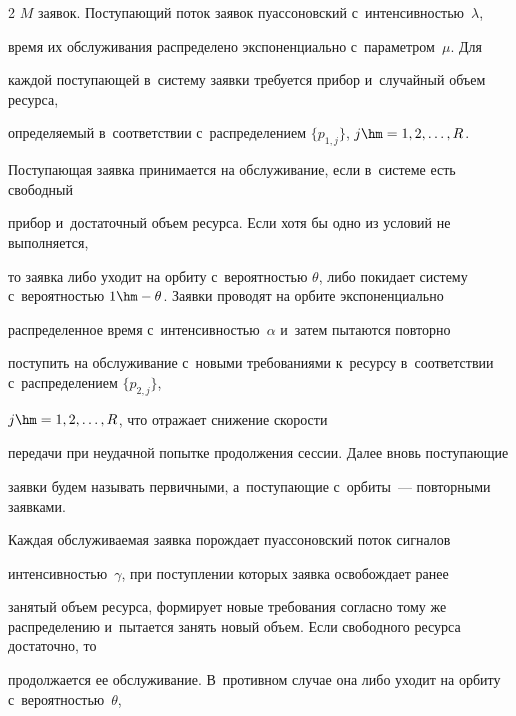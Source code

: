 \begin{multicols}{2}
$M$ заявок. По\-сту\-па\-ющий поток заявок пуассоновский с~ин\-тен\-сив\-ностью~$\lambda$, 

время их обслуживания распределено экспоненциально с~па\-ра\-мет\-ром~$\mu$. Для 

каж\-дой по\-сту\-па\-ющей в~сис\-те\-му заявки требуется прибор и~случайный объем ресурса, 

опре\-де\-ля\-емый в~соответствии с~распределением $\{p_{1,j}\}$, $j\hm=1,2,\dots, R$. 

По\-сту\-па\-ющая заявка принимается на обслуживание, если в~сис\-те\-ме есть свободный 

прибор и~достаточный объем ресурса. Если хотя бы одно из условий не выполняется, 

то заявка либо уходит на орбиту с~вероятностью $\theta$, либо покидает сис\-те\-му с~ве\-ро\-ят\-ностью $1\hm-\theta$. Заявки проводят на орбите экспоненциально 

распределенное время с~ин\-тен\-сив\-ностью~$\alpha$ и~затем пытаются повторно 

по\-сту\-пить на обслуживание с~новыми требованиями к~ресурсу в~соответствии с~распределением $\{p_{2,j}\}$,\linebreak

\vspace*{-12pt}



\pagebreak



\noindent

 $j\hm=1,2,\ldots, R$, что отражает снижение ско\-рости 

переда\-чи при неудачной попытке продолжения сес\-сии. Далее вновь поступающие 

заявки будем называть первичными, а~по\-сту\-па\-ющие с~орбиты~--- по\-втор\-ны\-ми за\-яв\-ками.





Каждая обслуживаемая заявка порождает пуассоновский поток сигналов 

ин\-тен\-сив\-ностью~$\gamma$, при по\-ступ\-ле\-нии которых заявка освобождает ранее 

занятый объем ресурса, формирует новые требования согласно тому же распределению и~пытается занять новый объем. Если свободного ресурса достаточно, то 

продолжается ее обслуживание. В~противном случае она либо уходит на орбиту с~ве\-ро\-ят\-ностью~$\theta$, 


\end{multicols}
